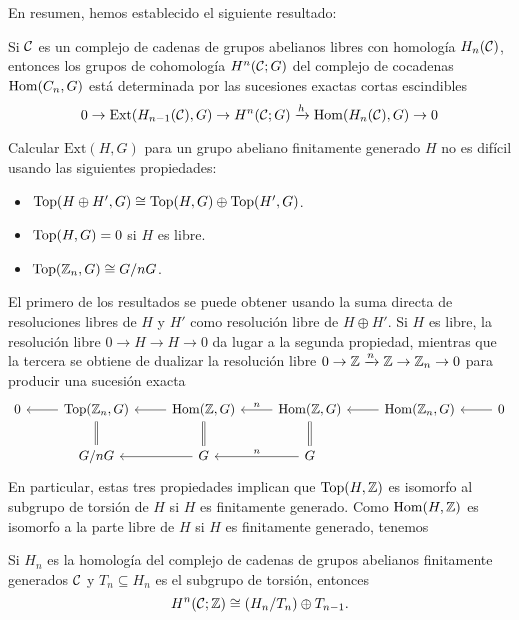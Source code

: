 \documentclass[TA.tex]{subfiles}
\begin{document}
En resumen, hemos establecido el siguiente resultado:
\begin{teorema}
Si $\mathcal{C}$ es un complejo de cadenas de grupos abelianos libres con homología $H_n(\mathcal{C})$, entonces los grupos de cohomología $H^n(\mathcal{C};G)$ del complejo de cocadenas $\operatorname{Hom}(C_n,G)$ está determinada por las sucesiones exactas cortas escindibles
\[
0\to \mathrm{Ext}(H_{n-1}(\mathcal{C}),G)\to H^n(\mathcal{C};G)\xrightarrow{h}\operatorname{Hom}(H_n(\mathcal{C}),G)\to 0
\]

Calcular $\mathrm{Ext}(H,G)$ para un grupo abeliano finitamente generado $H$ no es difícil usando las siguientes propiedades:
\begin{itemize}
\item $\operatorname{Top}(H\oplus H',G)\cong\operatorname{Top}(H,G)\oplus\operatorname{Top}(H',G)$.
\item $\operatorname{Top}(H,G)=0$ si $H$ es libre.
\item $\operatorname{Top}(\mathbb{Z}_n,G)\cong G/nG$.
\end{itemize}
\end{teorema}
El primero de los resultados se puede obtener usando la suma directa de resoluciones libres de $H$ y $H'$ como resolución libre de $H\oplus H'$. Si $H$ es libre, la resolución libre $0\to H\to H\to 0$ da lugar a la segunda propiedad, mientras que la tercera se obtiene de dualizar la resolución libre $0\to\mathbb{Z}\xrightarrow{n}\mathbb{Z}\to\mathbb{Z}_n\to 0$ para producir una sucesión exacta
\[
\begin{tikzcd}
0 & \Ext(\Z_n,G)\arrow[l]\arrow[d,equals] & \Hom(\Z,G)\arrow[l]\arrow[d, equals] &\Hom(\Z,G)\arrow[l, "n"' ] & \Hom(\Z_n,G)\arrow[l] & 0\arrow[l]\\
& G/nG &G\arrow[l] & G\arrow[l, "n"']\arrow[u, equals]
\end{tikzcd}
\]
En particular, estas tres propiedades implican que $\operatorname{Top}(H,\mathbb{Z})$ es isomorfo al subgrupo de torsión de $H$ si $H$ es finitamente generado. Como $\operatorname{Hom}(H,\mathbb{Z})$ es isomorfo a la parte libre de $H$ si $H$ es finitamente generado, tenemos
\begin{coro}
Si $H_n$ es la homología del complejo de cadenas de grupos abelianos finitamente generados $\mathcal{C}$ y $T_n\subseteq H_n$ es el subgrupo de torsión, entonces
\[
H^n(\mathcal{C};\mathbb{Z})\cong (H_n/T_n)\oplus T_{n-1}.
\]
\end{coro} 
\end{document}
